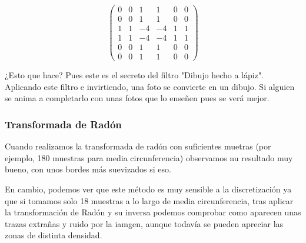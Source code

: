 		\[ \begin{pmatrix}
			0 & 0 & 1 & 1 & 0 & 0\\
			0 & 0 & 1 & 1 & 0 & 0\\
			1 & 1 & -4 & -4  & 1 & 1\\
			1 & 1 & -4 & -4  & 1 & 1\\
			0 & 0 & 1 & 1 & 0 & 0\\
			0 & 0 & 1 & 1 & 0 & 0
			\end{pmatrix}\]

		¿Esto que hace? Pues este es el secreto del filtro "Dibujo hecho a lápiz". Aplicando este filtro e invirtiendo, una foto se convierte en un dibujo. Si alguien se anima a completarlo con unas fotos que lo enseñen pues se verá mejor.


	\subsubsection{Transformada de Radón}

		Cuando realizamos la transformada de radón con suficientes muetras (por ejemplo, 180 muestras para media circunferencia) observamos nu resultado muy bueno, con unos bordes más suevizados si eso.

		En cambio, podemos ver que este método es muy sensible a la discretización ya que si tomamos solo 18 muestras a lo largo de media circunferencia, tras aplicar la transformación de Radón y su inversa podemos comprobar como aparecen unas trazas extrañas y ruido por la iamgen, aunque todavía se pueden apreciar las zonas de distinta densidad.









